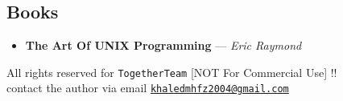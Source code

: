 \documentclass[12pt]{article}
\begin{document}
\subsection*{Books}
\begin{itemize}
    \item \textbf{The Art Of UNIX Programming} — \textit{Eric Raymond}
\end{itemize}

\vspace{\fill}
\begin{center}
\color{muted}
All rights reserved for \texttt{TogetherTeam} [NOT For Commercial Use] !!\\
contact the author via email \href{mailto:khaledmhfz2004@gmail.com}{\texttt{khaledmhfz2004@gmail.com}}
\end{center}
\end{document}
